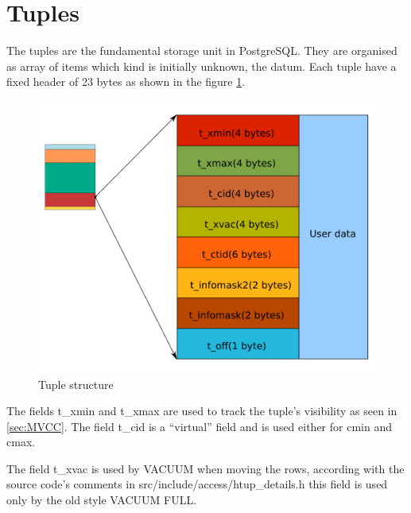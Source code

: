 \section{Tuples}
\label{sec:TUPLES}
The tuples are the fundamental storage unit in PostgreSQL. They are organised as array of items which kind 
is initially unknown, the datum. Each tuple have a fixed header of 23 bytes as shown in the figure 
\ref{fig:TUPLES01}.\newline

\begin{figure}[H]
\begin{center}

\includegraphics[scale=0.55]{images/tuples_01.png}

\caption{Tuple structure}
\label{fig:TUPLES01} 
\end{center}

\end{figure}

The fields t\_xmin and t\_xmax are used to track the tuple's visibility as 
seen in \ref{sec:MVCC}. The field t\_cid is a ``virtual'' field and is used either for cmin 
and cmax. \newline

The field t\_xvac is used by VACUUM when moving the rows, according with the source code's 
comments in src/include/access/htup\_details.h this field is used only by the old style VACUUM FULL. 
\newline

